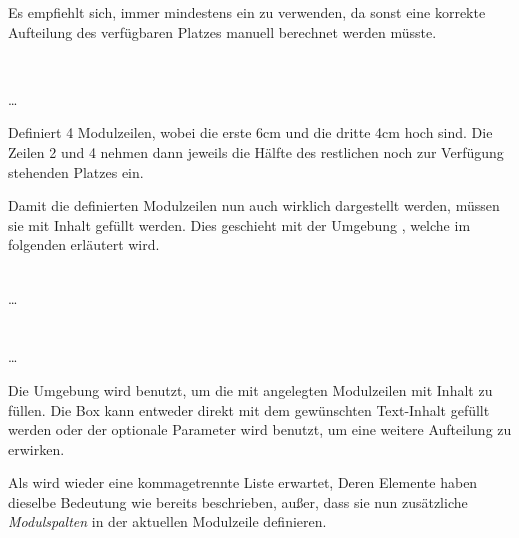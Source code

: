 \begin{hint}
Es empfiehlt sich, immer mindestens ein  zu verwenden, da sonst
eine korrekte Aufteilung des verfügbaren Platzes manuell berechnet werden
müsste.
\end{hint}


\begin{minipage}{0.6\textwidth}
\begin{example}~\par
  \noindent{}
    \par
  \quad\dots\\
  \bigskip\par
  \noindent Definiert 4 Modulzeilen, wobei die erste 6cm und die dritte 4cm hoch sind.
  Die Zeilen 2 und 4 nehmen dann jeweils die Hälfte des restlichen 
  noch zur Verfügung stehenden Platzes ein.
\end{example}
\end{minipage}
\hfill
\begin{minipage}{0.3\textwidth}\centering
\end{minipage}

Damit die definierten Modulzeilen nun auch wirklich dargestellt werden,
müssen sie mit Inhalt gefüllt werden. Dies geschieht mit der Umgebung
, welche im folgenden erläutert wird.

\begin{Declaration}
    \\%
  \quad\dots\\
  \\
    \\%
  \quad\dots\\
\end{Declaration}

Die Umgebung  wird benutzt,
um die mit  angelegten Modulzeilen mit Inhalt zu füllen.
Die Box kann entweder direkt mit dem gewünschten Text-Inhalt gefüllt werden
oder der optionale Parameter  wird benutzt, um
eine weitere Aufteilung zu erwirken.

Als  wird wieder eine kommagetrennte Liste erwartet,
Deren Elemente haben dieselbe Bedeutung wie bereits beschrieben, außer, dass
sie nun zusätzliche \emph{Modulspalten} in der aktuellen Modulzeile definieren.

